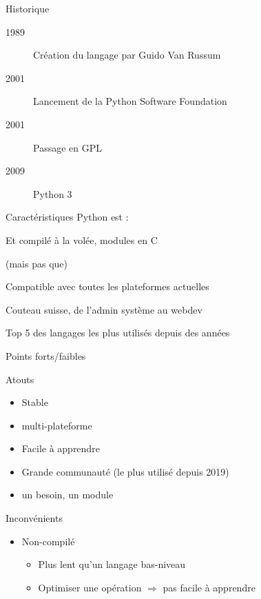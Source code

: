 \begin{frame}{Historique}
  \begin{description}
  \item[1989] Création du langage par Guido Van Russum
  \item[2001] Lancement de la Python Software Foundation
  \item[2001] Passage en GPL
  \item[2009] Python 3
  \end{description}
\end{frame}

\begin{frame}{Caractéristiques}
  Python est :
  \begin{description}[<+(1)->]
  \item[Interprété] Et compilé à la volée, modules en C
  \item[Orienté objet] (mais pas que)
  \item[Portable] Compatible  avec toutes les plateformes actuelles
  \item[Flexible] Couteau suisse, de l'admin système au webdev
  \item[Populaire] Top 5 des langages les plus utilisés depuis des années
  \end{description}
\end{frame}

\begin{frame}{Points forts/faibles}
  \begin{minipage}[l]{0.49\linewidth}
    Atouts
    \begin{itemize}
    \item Stable
    \item multi-plateforme
    \item Facile à apprendre
    \item Grande communauté (le plus utilisé depuis 2019)
    \item un besoin, un module
    \end{itemize}
  \end{minipage}\hfill
  \begin{minipage}[l]{0.49\linewidth}
    Inconvénients
    \begin{itemize}
    \item Non-compilé
      \begin{itemize}
      \item Plus lent qu'un langage bas-niveau
      \item Optimiser une opération $\Rightarrow$ pas facile à apprendre
      \end{itemize}
    \end{itemize}
  \end{minipage}\hfill
\end{frame}

